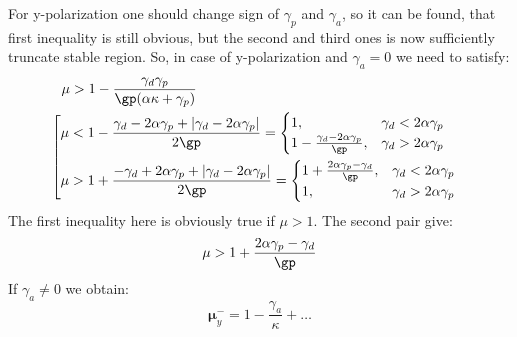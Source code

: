 \documentclass[12pt, notitlepage]{report}
\begin{document}
For y-polarization one should change sign of $\gamma_p$ and $\gamma_a$, so it can be found, that first inequality is still obvious, but the second and third ones is now sufficiently truncate stable region. So, in case of y-polarization and $\gamma_a = 0$ we need to satisfy:
\begin{align}
	&\mu > 1 - \frac{\gamma_d\gamma_p}{\gp (\alpha\kappa + \gamma_p)}\\	
	& \hspace{-9pt} \left[ \begin{aligned}
		\mu &< 1 - \frac{\gamma_d - 2 \alpha  \gamma_p+| \gamma_d-2 \alpha  \gamma_p|}{2 \gp } = \begin{cases}
			1, &\gamma_d < 2\alpha\gamma_p\\
			1 - \frac{\gamma_d - 2 \alpha  \gamma_p}{\gp }, &\gamma_d > 2\alpha\gamma_p
		\end{cases} \\
		\mu &> 1 + \frac{-\gamma_d +2 \alpha  \gamma_p+| \gamma_d-2 \alpha  \gamma_p|}{2 \gp } = 
		\begin{cases}
			1 + \frac{2 \alpha  \gamma_p - \gamma_d}{\gp }, &\gamma_d < 2\alpha\gamma_p\\
			1, &\gamma_d > 2\alpha\gamma_p
		\end{cases}
	\end{aligned}\right.
\end{align}
The first inequality here is obviously true if $\mu > 1$. The second pair give:
\begin{equation}
		\mu > 1 + \frac{2 \alpha  \gamma_p - \gamma_d}{\gp}
\end{equation}
If $\gamma_a \ne 0$ we obtain:
\begin{equation}
	\boldsymbol{\mu}_y^- = 1 - \frac{\gamma_a}{\kappa} + \dots
\end{equation}
\end{document}
